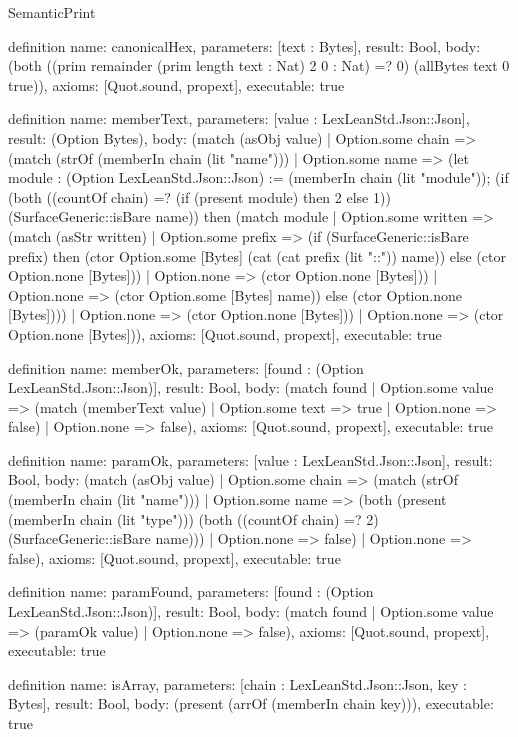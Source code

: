 \begin{lexlean}{SemanticPrint}
\begin{semanticmodule}
definition{
  name: canonicalHex,
  parameters: [text : Bytes],
  result: Bool,
  body: (both ((prim remainder (prim length text : Nat) 2 0 : Nat) =? 0) (allBytes text 0 true)),
  axioms: [Quot.sound, propext],
  executable: true
}

definition{
  name: memberText,
  parameters: [value : LexLeanStd.Json::Json],
  result: (Option Bytes),
  body: (match (asObj value)
    | Option.some chain => (match (strOf (memberIn chain (lit "name")))
      | Option.some name => (let module : (Option LexLeanStd.Json::Json) := (memberIn chain (lit "module")); (if (both ((countOf chain) =? (if (present module) then 2 else 1)) (SurfaceGeneric::isBare name)) then (match module
        | Option.some written => (match (asStr written)
          | Option.some prefix => (if (SurfaceGeneric::isBare prefix) then (ctor Option.some [Bytes] (cat (cat prefix (lit "::")) name)) else (ctor Option.none [Bytes]))
          | Option.none => (ctor Option.none [Bytes]))
        | Option.none => (ctor Option.some [Bytes] name)) else (ctor Option.none [Bytes])))
      | Option.none => (ctor Option.none [Bytes]))
    | Option.none => (ctor Option.none [Bytes])),
  axioms: [Quot.sound, propext],
  executable: true
}

definition{
  name: memberOk,
  parameters: [found : (Option LexLeanStd.Json::Json)],
  result: Bool,
  body: (match found
    | Option.some value => (match (memberText value)
      | Option.some text => true
      | Option.none => false)
    | Option.none => false),
  axioms: [Quot.sound, propext],
  executable: true
}

definition{
  name: paramOk,
  parameters: [value : LexLeanStd.Json::Json],
  result: Bool,
  body: (match (asObj value)
    | Option.some chain => (match (strOf (memberIn chain (lit "name")))
      | Option.some name => (both (present (memberIn chain (lit "type"))) (both ((countOf chain) =? 2) (SurfaceGeneric::isBare name)))
      | Option.none => false)
    | Option.none => false),
  axioms: [Quot.sound, propext],
  executable: true
}

definition{
  name: paramFound,
  parameters: [found : (Option LexLeanStd.Json::Json)],
  result: Bool,
  body: (match found | Option.some value => (paramOk value) | Option.none => false),
  axioms: [Quot.sound, propext],
  executable: true
}

definition{
  name: isArray,
  parameters: [chain : LexLeanStd.Json::Json, key : Bytes],
  result: Bool,
  body: (present (arrOf (memberIn chain key))),
  executable: true
}


\end{semanticmodule}
\end{lexlean}

